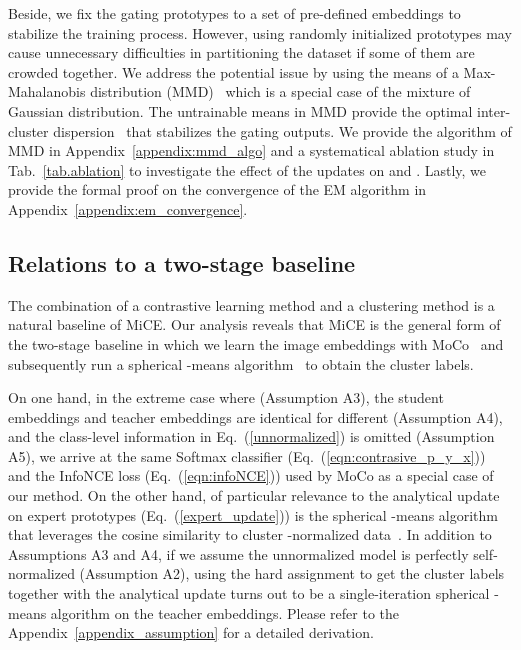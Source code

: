 \documentclass{article} \usepackage{iclr2021_conference,times}
\begin{document}
Beside, we fix the gating prototypes  to a set of pre-defined embeddings to stabilize the training process.
However, using randomly initialized prototypes may cause unnecessary difficulties in partitioning the dataset if some of them are crowded together. We address the potential issue by using the means of a Max-Mahalanobis distribution (MMD)~\citep{pang2018max} which is a special case of the mixture of Gaussian distribution. The untrainable means in MMD provide the optimal inter-cluster dispersion~\citep{pang2019rethinking} that stabilizes the gating outputs. 
We provide the algorithm of MMD in Appendix~\ref{appendix:mmd_algo} and a systematical ablation study in Tab.~\ref{tab.ablation} to investigate the effect of the updates on  and . Lastly, we provide the formal proof on the convergence of the EM algorithm in Appendix~\ref{appendix:em_convergence}.














\subsection{Relations to a two-stage baseline}\label{sec.two_stage}
The combination of a contrastive learning method and a clustering method is a natural baseline of MiCE. Our analysis reveals that MiCE is the general form of the two-stage baseline in which we learn the image embeddings with MoCo~\citep{he2019momentum} and subsequently run a spherical -means algorithm~\citep{dhillon2001concept} to obtain the cluster labels. 


On one hand, in the extreme case where  (Assumption A3),  the student embeddings  and teacher embeddings  are identical for different  (Assumption A4), and the class-level information in Eq.~(\ref{unnormalized}) is omitted (Assumption A5), we arrive at the same Softmax classifier (Eq.~(\ref{eqn:contrasive_p_y_x})) and the InfoNCE loss (Eq.~(\ref{eqn:infoNCE})) used by MoCo
as a special case of our method. On the other hand, of particular relevance to the analytical update on expert prototypes (Eq.~(\ref{expert_update})) is the spherical -means algorithm~\citep{dhillon2001concept} that leverages the cosine similarity to cluster -normalized data~\citep{hornik2012spherical}.
In addition to Assumptions A3 and A4, if we assume the unnormalized model is perfectly self-normalized (Assumption A2),  using the hard assignment to get the cluster labels together with the analytical update turns out to be a single-iteration spherical -means algorithm on the teacher embeddings. Please refer to the Appendix~\ref{appendix_assumption} for a detailed derivation.
\end{document}
